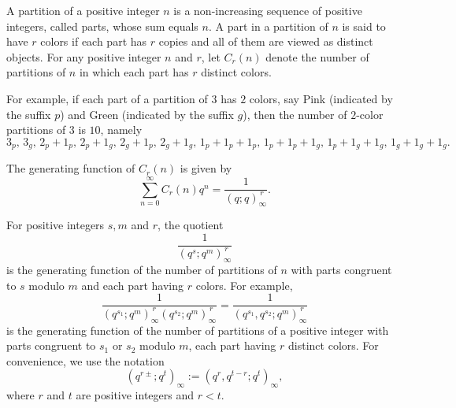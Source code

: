 \documentclass[11pt,a4paper]{article}
\numberwithin{equation}{section}
\theoremstyle{plain}
\begin{document}
	A partition of a positive integer $n$ is a non-increasing sequence of positive integers, called parts, whose
	sum equals $n$. A part in a partition of $n$ is said to have $r$ colors if each part has $r$ copies and all of
	them are viewed as distinct objects. For any positive integer $n$ and $r$, let $C_r(n)$ denote the number of
	partitions of $n$ in which each part has $r$ distinct colors. 
	
	For example, if each part of a partition of $3$ has $2$ colors, say Pink (indicated by the suffix $p$) and
	Green (indicated by the suffix $g$), then the number of $2$-color partitions of $3$ is $10$, namely
	\[
	3_p,\, 3_g,\, 2_p+1_p,\, 2_p+1_g,\, 2_g+1_p,\, 2_g+1_g,\, 
	1_p+1_p+1_p,\, 1_p+1_p+1_g,\, 1_p+1_g+1_g,\, 1_g+1_g+1_g.
	\]
	
	The generating function of $C_r(n)$ is given by
	\begin{equation}
		\sum_{n=0}^{\infty} C_r(n) q^n = \frac{1}{(q;q)_\infty^{\,r}} .
		\tag{4.1}
	\end{equation}
	
	For positive integers $s,m$ and $r$, the quotient
	\begin{equation}
		\frac{1}{(q^s;q^m)_\infty^{\,r}}
		\tag{4.2}
	\end{equation}
	is the generating function of the number of partitions of $n$ with parts congruent to $s$ modulo $m$ and
	each part having $r$ colors. For example,
	\begin{equation}
		\frac{1}{(q^{s_1};q^m)_\infty^{\,r}(q^{s_2};q^m)_\infty^{\,r}}
		=
		\frac{1}{(q^{s_1},q^{s_2};q^m)_\infty^{\,r}}
		\tag{4.3}
	\end{equation}
	is the generating function of the number of partitions of a positive integer with parts congruent to $s_1$
	or $s_2$ modulo $m$, each part having $r$ distinct colors.	
	For convenience, we use the notation
	\begin{equation}
		(q^{r\pm};q^t)_\infty := (q^r,q^{t-r};q^t)_\infty,
		\tag{4.4}
	\end{equation}
	where $r$ and $t$ are positive integers and $r<t$.
\end{document}
